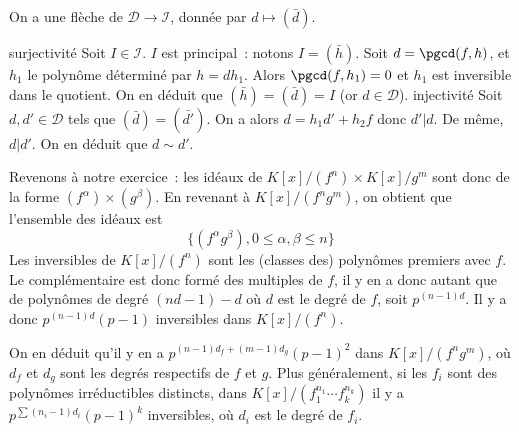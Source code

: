 {\begin{enumerate}
{   On a une flèche de $\mathcal{D}\to\mathcal{I}$, donnée par
   $d\mapsto(\bar{d})$.
   \begin{itemize}
surjectivité
     Soit $I\in\mathcal{I}$. $I$ est principal~: notons $I=(\bar{h})$.
     Soit $d=\pgcd(f,h)$, et $h_{1}$ le polynôme déterminé par
     $h=dh_{1}$. Alors $\pgcd(f,h_{1})=0$ et $h_{1}$ est inversible dans
     le quotient. On en déduit que $(\bar{h})=(\bar{d})=I$ (or $d\in\mathcal{D}$).
injectivité
     Soit $d,d'\in\mathcal{D}$ tels que $(\bar{d})=(\bar{d'})$. On a
     alors $d=h_{1}d'+h_{2}f$ donc $d'|d$. De même, $d|d'$. On en déduit
     que $d\sim d'$.
   \end{itemize}

   \smallskip
   
   Revenons à notre exercice~: les idéaux de $K[x]/(f^{n})\times
   K[x]/g^{m}$ sont donc de la forme $(f^{\alpha})\times(g^{\beta})$. En
   revenant à $K[x]/(f^{n}g^{m})$, on obtient que l'ensemble des idéaux
   est $$\{(f^{\alpha}g^{\beta}), 0\leq\alpha,\beta\leq n\}$$
Les inversibles de $K[x]/(f^{n})$ sont les (classes des) polynômes
   premiers avec $f$. Le complémentaire est donc formé des multiples de
   $f$, il y en a donc autant que de polynômes de degré $(nd-1)-d$ où $d$
   est le degré de $f$, soit $p^{(n-1)d}$. Il y a donc $p^{(n-1)d}(p-1)$
   inversibles dans $K[x]/(f^{n})$.

   On en déduit qu'il y en a $p^{(n-1)d_{f}+(m-1)d_{g}}(p-1)^{2}$ dans
   $K[x]/(f^{n}g^{m})$, où $d_{f}$ et $d_{g}$ sont les degrés respectifs
   de $f$ et $g$.
Plus généralement, si les $f_{i}$ sont des polynômes irréductibles
   distincts, dans $K[x]/(f_{1}^{n_{1}}\cdots f_{k}^{n_{k}})$ il y a
   $p^{\sum (n_{i}-1)d_{i}}(p-1)^{k}$ inversibles, où $d_{i}$ est le
   degré de $f_{i}$.
}
\end{enumerate}
}
